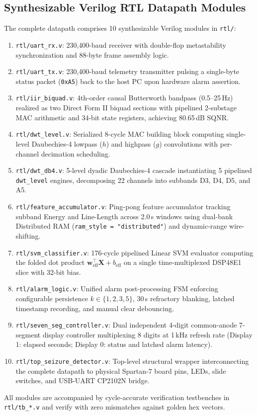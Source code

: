 \documentclass[10pt,twocolumn,letterpaper]{article}
\begin{document}
{\color{blue}
\subsection{Synthesizable Verilog RTL Datapath Modules}

The complete datapath comprises 10 synthesizable Verilog modules in \texttt{rtl/}:
\begin{enumerate}
    \item \texttt{rtl/uart\_rx.v}: 230,400-baud receiver with double-flop metastability synchronization and 88-byte frame assembly logic.
    \item \texttt{rtl/uart\_tx.v}: 230,400-baud telemetry transmitter pulsing a single-byte status packet (\texttt{0xA5}) back to the host PC upon hardware alarm assertion.
    \item \texttt{rtl/iir\_biquad.v}: 4th-order causal Butterworth bandpass (0.5--25\,Hz) realized as two Direct Form II biquad sections with pipelined 2-substage MAC arithmetic and 34-bit state registers, achieving 80.65\,dB SQNR.
    \item \texttt{rtl/dwt\_level.v}: Serialized 8-cycle MAC building block computing single-level Daubechies-4 lowpass ($h$) and highpass ($g$) convolutions with per-channel decimation scheduling.
    \item \texttt{rtl/dwt\_db4.v}: 5-level dyadic Daubechies-4 cascade instantiating 5 pipelined \texttt{dwt\_level} engines, decomposing 22 channels into subbands D3, D4, D5, and A5.
    \item \texttt{rtl/feature\_accumulator.v}: Ping-pong feature accumulator tracking subband Energy and Line-Length across 2.0\,s windows using dual-bank Distributed RAM (\texttt{ram\_style = "distributed"}) and dynamic-range wire-shifting.
    \item \texttt{rtl/svm\_classifier.v}: 176-cycle pipelined Linear SVM evaluator computing the folded dot product $\mathbf{w}_{\text{eff}}^\top \mathbf{X} + b_{\text{eff}}$ on a single time-multiplexed DSP48E1 slice with 32-bit bias.
    \item \texttt{rtl/alarm\_logic.v}: Unified alarm post-processing FSM enforcing configurable persistence $k \in \{1, 2, 3, 5\}$, 30\,s refractory blanking, latched timestamp recording, and manual clear debouncing.
    \item \texttt{rtl/seven\_seg\_controller.v}: Dual independent 4-digit common-anode 7-segment display controller multiplexing 8 digits at 1\,kHz refresh rate (Display 1: elapsed seconds; Display 0: status and latched alarm latency).
    \item \texttt{rtl/top\_seizure\_detector.v}: Top-level structural wrapper interconnecting the complete datapath to physical Spartan-7 board pins, LEDs, slide switches, and USB-UART CP2102N bridge.
\end{enumerate}

All modules are accompanied by cycle-accurate verification testbenches in \texttt{rtl/tb\_*.v} and verify with zero mismatches against golden hex vectors.
}
\end{document}
